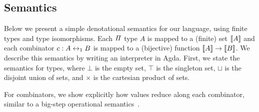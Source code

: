 



\subsection{Semantics}
\label{subsec:denotational}

\noindent Below we present a simple denotational semantics for our language, using finite types and type isomorphisms.
Each $\mathit{\Pi}$ type $A$ is mapped to a (finite) set $\llbracket A\rrbracket$ and each combinator $c : A \leftrightarrow_1 B$ is mapped to a
(bijective) function $\llbracket A\rrbracket \to \llbracket B\rrbracket$. We describe this semantics by writing an interpreter in Agda. First, we
state the semantics for types, where $\bot$ is the empty set, $\top$ is the singleton set, $\sqcup$ is the disjoint
union of sets, and $\times$ is the cartesian product of sets.


\begin{center}
  {}
\end{center}

For combinators, we show explicitly how values reduce along each combinator, similar to a big-step operational
semantics~\cite{chenComputationalInterpretationCompact2021,theseus}.

